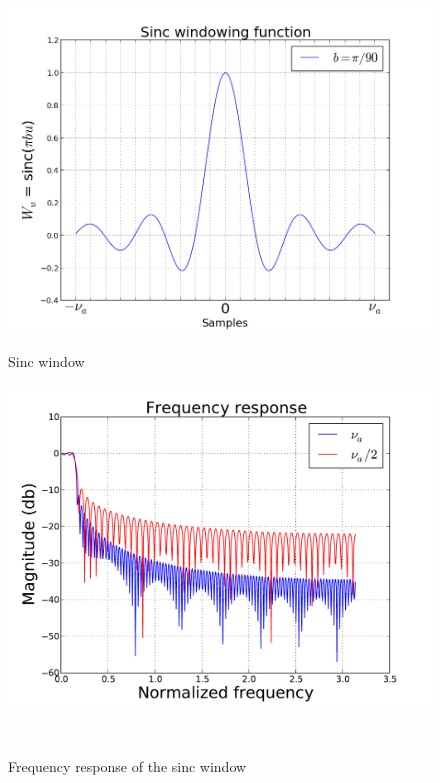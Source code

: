 \documentclass[useAMS,usenatbib]{mn2e}
\begin{document}
\begin{figure}
\begin{minipage}{0.36\linewidth}\includegraphics[width=1\textwidth]{./Figures/sinc.png}\caption{Sinc 
window}\label{fig:fig_sinc}\end{minipage}
\hspace{1cm}
\begin{minipage}{0.36\linewidth}\includegraphics[width=1\textwidth]{./Figures/freq_resp_sinc.pdf}\caption{Frequency response of the 
sinc window }\label{fig:fig_sinc_freq}\end{minipage}\\

\end{figure}
\end{document}
